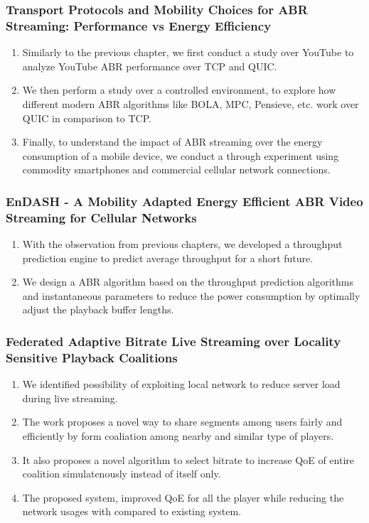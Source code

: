 \subsubsection{Transport Protocols and Mobility Choices for ABR Streaming: Performance vs Energy Efficiency}
\begin{enumerate}
	\item Similarly to the previous chapter, we first conduct a study over YouTube to analyze YouTube ABR performance over TCP and QUIC.
	\item We then perform a study over a controlled environment, to explore how different modern ABR algorithms like BOLA, MPC, Pensieve, etc. work over QUIC in comparison to TCP.
	\item Finally, to understand the impact of ABR streaming over the energy consumption of a mobile device, we conduct a through experiment using commodity smartphones and commercial cellular network connections.
\end{enumerate}

\subsubsection{EnDASH - A Mobility Adapted Energy
Efficient ABR Video Streaming for
Cellular Networks}
\begin{enumerate}
	\item With the observation from previous chapters, we developed a throughput prediction engine to predict average throughput for a short future.
	\item We design a ABR algorithm based on the throughput prediction algorithms and instantaneous parameters to reduce the power consumption by optimally adjust the playback buffer lengths.
\end{enumerate}

\subsubsection{Federated Adaptive Bitrate Live
Streaming over Locality Sensitive
Playback Coalitions}
\begin{enumerate}
	\item We identified possibility of exploiting local network to reduce server load during live streaming.
	\item The work proposes a novel way to share segments among users fairly and efficiently by form coaliation among nearby and similar type of players.
	\item It also proposes a novel algorithm to select bitrate to increase QoE of entire coalition simulatenously instead of itself only.
	\item The proposed system, improved QoE for all the player while reducing the network usages with compared to existing system.
\end{enumerate}



